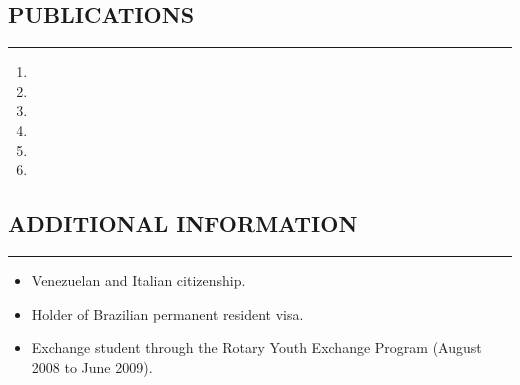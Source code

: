 \documentclass[11pt,letterpaper]{article}
\begin{document}
\subsection*{PUBLICATIONS}
	\vspace{-0.5em}
	\hrule
	\vspace{0.6em}

\begin{enumerate}
	\item {}
	\item {}
	\item {}
	\item {}
	\item {}
	\item {}
\end{enumerate}
	
\subsection*{ADDITIONAL INFORMATION}
	\vspace{-0.5em}
	\hrule
	\vspace{0.8em}
	\begin{itemize}
		\item Venezuelan and Italian citizenship.
		\item Holder of Brazilian permanent resident visa.
		\item Exchange student through the Rotary Youth Exchange Program (August 2008 to June 2009).
	\end{itemize}
	
	
\end{document}
